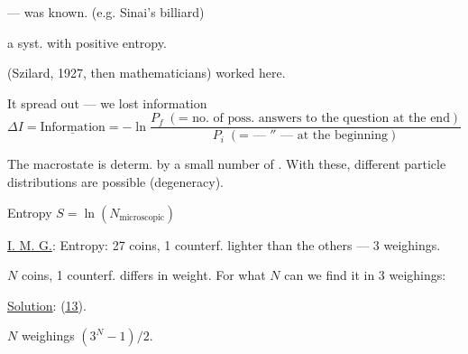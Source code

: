 --- was known. (e.g. Sinai’s billiard)

a syst. with positive entropy.

 (Szilard, 1927, then mathematicians) worked here.

It spread out --- we lost information
\[
\Delta I=\underline{\text{Information}}=-\ln
\frac{P_f\;(\mathord{=}\text{ no. of poss. answers to the question at the end})}
{P_i\;(\mathord{=}\text{ --- ″ --- at the beginning})}
\]


The macrostate is determ. by a small number of . With these, different particle distributions are possible (degeneracy).

Entropy \(S=\ln(N_{\text{microscopic}})\)

\underline{I. M. G.}: Entropy: 27 coins, 1 counterf. lighter than the others --- 3 weighings.

\(N\) coins, 1 counterf. differs in weight. For what \(N\) can we find it in 3 weighings:

\underline{Solution}:  (\underline{\underline{13}}).

\(N\) weighings \((3^N-1)/2\).


